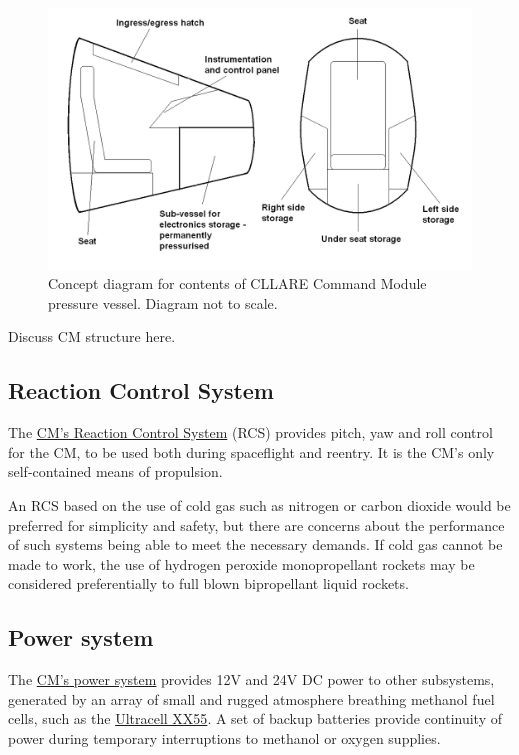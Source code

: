\documentclass{report}
\begin{document}
\begin{figure}[ht] \label{fig:cm_internals}
\centering
\includegraphics[scale=0.3]{images/cllare_cm_pressure_vessel_contents}
\caption{Concept diagram for contents of CLLARE Command Module pressure vessel.  Diagram not to scale.}
\end{figure}

Discuss CM structure here.

\subsection{Reaction Control System}

The \href{http://cstart.org/wiki/CLLARE_CM_Reaction_Control_System}{CM's Reaction Control System} (RCS) provides pitch, yaw and roll control for the CM, to be used both during spaceflight and reentry. It is the CM's only self-contained means of propulsion.

An RCS based on the use of cold gas such as nitrogen or carbon dioxide would be preferred for simplicity and safety, but there are concerns about the performance of such systems being able to meet the necessary demands.  If cold gas cannot be made to work, the use of hydrogen peroxide monopropellant rockets may be considered preferentially to full blown bipropellant liquid rockets.

\subsection{Power system}

The \href{http://cstart.org/wiki/CLLARE_CM_Power_System}{CM's power system} provides 12V and 24V DC power to other subsystems, generated by an array of small and rugged atmosphere breathing methanol fuel cells, such as the \href{http://www.ultracellpower.com/assets/XX55_Data_Sheet_01-27-2009.pdf}{Ultracell XX55}.  A set of backup batteries provide continuity of power during temporary interruptions to methanol or oxygen supplies.
\end{document}
